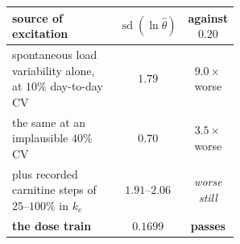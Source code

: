 \begin{tabular}{@{}>{\raggedright\arraybackslash}p{0.56\linewidth}cc@{}}
\toprule
\textbf{source of excitation} & \textbf{$\operatorname{sd}(\ln\hat\theta)$} & \textbf{against $0.20$} \\
\midrule
spontaneous load variability alone, at $10\%$ day-to-day CV & $1.79$ & $9.0\times$ worse \\
\quad the same at an implausible $40\%$ CV & $0.70$ & $3.5\times$ worse \\
plus recorded carnitine steps of $25$--$100\%$ in $k_e$ & $1.91$--$2.06$ & \emph{worse still} \\
\textbf{the dose train} & $\mathbf{0.1699}$ & \textbf{passes} \\
\bottomrule
\end{tabular}
